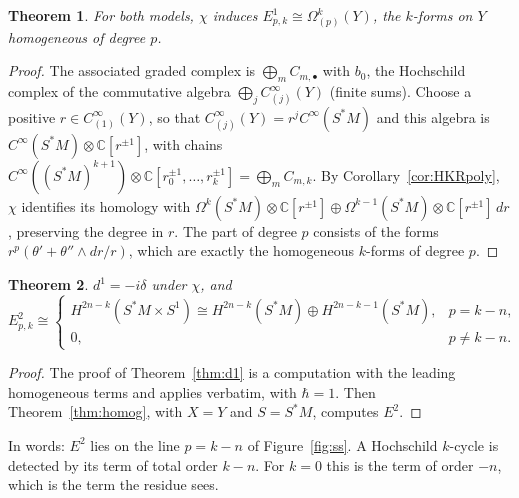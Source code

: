 \documentclass[11pt,oneside,reqno]{article}
\newcommand{\C}{\mathbb C}
\newcommand{\CI}{C^\infty}
\newcommand{\Om}{\Omega}
\newcommand{\hb}{\hbar}
\theoremstyle{plain}
\newtheorem{theorem}{Theorem}[section]
\theoremstyle{definition}
\theoremstyle{remark}
\begin{document}
\begin{theorem}\label{thm:PE1}
For both models, \(\chi\) induces \(E^1_{p,k}\cong\Om^k_{(p)}(Y)\), the \(k\)-forms on \(Y\)
homogeneous of degree \(p\).
\end{theorem}

\begin{proof}
The associated graded complex is \(\bigoplus_mC_{m,\bullet}\) with \(b_0\), the Hochschild
complex of the commutative algebra \(\bigoplus_j\CI_{(j)}(Y)\) (finite sums). Choose a
positive \(r\in\CI_{(1)}(Y)\), so that \(\CI_{(j)}(Y)=r^j\CI(S^*M)\) and this algebra is
\(\CI(S^*M)\otimes\C[r^{\pm1}]\), with chains
\(\CI((S^*M)^{k+1})\otimes\C[r_0^{\pm1},\dots,r_k^{\pm1}]=\bigoplus_mC_{m,k}\). By
Corollary~\ref{cor:HKRpoly}, \(\chi\) identifies its homology with
\(\Om^k(S^*M)\otimes\C[r^{\pm1}]\oplus\Om^{k-1}(S^*M)\otimes\C[r^{\pm1}]\,dr\), preserving the
degree in \(r\). The part of degree \(p\) consists of the forms
\(r^p(\theta'+\theta''\wedge dr/r)\), which are exactly the homogeneous \(k\)-forms of degree \(p\).
\end{proof}

\begin{theorem}\label{thm:PE2}
\(d^1=-i\delta\) under \(\chi\), and
\[
 E^2_{p,k}\cong\begin{cases}H^{2n-k}(S^*M\times S^1)\cong H^{2n-k}(S^*M)\oplus H^{2n-k-1}(S^*M),&p=k-n,\\
 0,&p\ne k-n.\end{cases}
\]
\end{theorem}

\begin{proof}
The proof of Theorem~\ref{thm:d1} is a computation with the leading
homogeneous terms and applies verbatim, with \(\hb=1\). Then
Theorem~\ref{thm:homog}, with \(X=Y\) and \(S=S^*M\), computes \(E^2\).
\end{proof}

In words: \(E^2\) lies on the line \(p=k-n\) of Figure~\ref{fig:ss}. A Hochschild
\(k\)-cycle is detected by its term of total order \(k-n\). For \(k=0\) this is the term
of order \(-n\), which is the term the residue sees.
\end{document}

